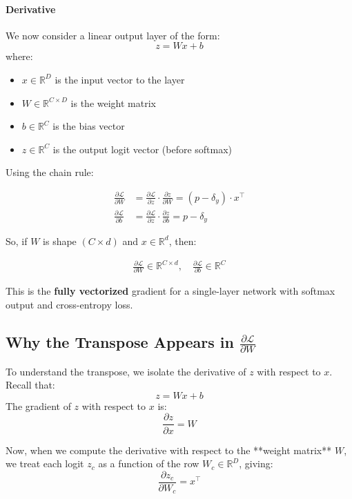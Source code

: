\paragraph{Derivative}

We now consider a linear output layer of the form:
\[
z = Wx + b
\]
where:
\begin{itemize}
    \item $x \in \mathbb{R}^D$ is the input vector to the layer
    \item $W \in \mathbb{R}^{C \times D}$ is the weight matrix
    \item $b \in \mathbb{R}^C$ is the bias vector
    \item $z \in \mathbb{R}^C$ is the output logit vector (before softmax)
\end{itemize}



Using the chain rule:

\begin{align}
	\frac{\partial \mathcal{L}}{\partial W}
	&= \frac{\partial \mathcal{L}}{\partial z} \cdot \frac{\partial z}{\partial W}
	= (p - \delta_y) \cdot x^\top \\
	\frac{\partial \mathcal{L}}{\partial b}
	&= \frac{\partial \mathcal{L}}{\partial z} \cdot \frac{\partial z}{\partial b}
	= p - \delta_y
\end{align}

So, if $W$ is shape $(C \times d)$ and $x \in \mathbb{R}^d$, then:

\begin{align}
	\frac{\partial \mathcal{L}}{\partial W} \in \mathbb{R}^{C \times d}, \quad
	\frac{\partial \mathcal{L}}{\partial b} \in \mathbb{R}^{C}
\end{align}

This is the \textbf{fully vectorized} gradient for a single-layer network with softmax output and cross-entropy loss.

\subsection*{Why the Transpose Appears in \texorpdfstring{$\frac{\partial \mathcal{L}}{\partial W}$}{∂L/∂W}}

To understand the transpose, we isolate the derivative of $z$ with respect to $x$. Recall that:
\[
z = Wx + b
\]
The gradient of $z$ with respect to $x$ is:
\[
\frac{\partial z}{\partial x} = W
\]

Now, when we compute the derivative with respect to the **weight matrix** \( W \), we treat each logit \( z_c \) as a function of the row \( W_c \in \mathbb{R}^D \), giving:
\[
\frac{\partial z_c}{\partial W_c} = x^\top
\]

